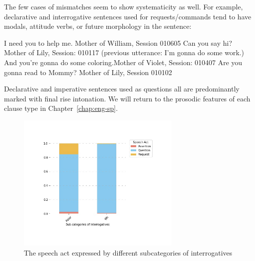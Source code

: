 The few cases of mismatches seem to show systematicity as well. For example, declarative and interrogative sentences used for requests/commands tend to have modals, attitude verbs, or future morphology in the sentence:

\bxl{}	I need you to help me.		\hfill	Mother of William, Session 010605
\ex	Can you say hi?				\hfill	Mother of Lily, Session: 010117
\ex	(previous utterance: I'm gonna do some work.)\\
And you’re gonna do some coloring.\hfill		Mother of Violet, Session: 010407
\ex  Are you gonna read to Mommy?	\hfill	Mother of Lily, Session 010102
\exl
\eex 

Declarative and imperative sentences used as questions all are predominantly marked with final rise intonation. We will return to the prosodic features of each clause type in Chapter~\ref{chap:eng-sp}.

\begin{figure}[H]
    \centering
    \includegraphics[width=0.7\textwidth]{figures/real-subIsp.jpg}
    \caption{The speech act expressed by different subcategories of interrogatives}
    \label{fig:real-subIsp}
\end{figure}




